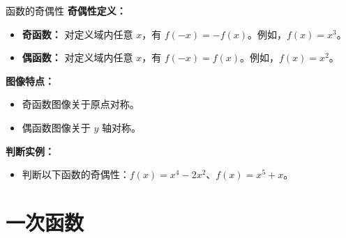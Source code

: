 \documentclass[aspectratio=169]{ctexbeamer} %
\begin{document}
\begin{frame}{函数的奇偶性}
    \textbf{奇偶性定义：}
    \begin{itemize}
        \item \textbf{奇函数：} 对定义域内任意 \( x \)，有 \( f(-x) = -f(x) \)。例如，\( f(x) = x^3 \)。
        \item \textbf{偶函数：} 对定义域内任意 \( x \)，有 \( f(-x) = f(x) \)。例如，\( f(x) = x^2 \)。
    \end{itemize}

    \vspace{0.5cm}
    \textbf{图像特点：}
    \begin{itemize}
        \item 奇函数图像关于原点对称。
        \item 偶函数图像关于 \( y \) 轴对称。
    \end{itemize}

    \vspace{0.5cm}
    \textbf{判断实例：}
    \begin{itemize}
        \item 判断以下函数的奇偶性：\( f(x) = x^4 - 2x^2 \)、\( f(x) = x^5 + x \)。
    \end{itemize}
\end{frame}

\section{一次函数}
\end{document}
